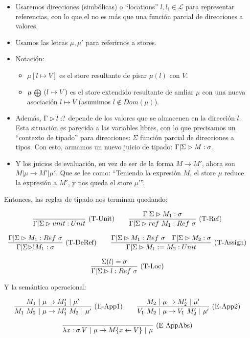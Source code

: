 \begin{itemize}
  \item Usaremos direcciones (simbólicas) o ``locations'' $l, l_i \in \mathcal{L}$ para representar referencias, con lo que el  no es más que una función parcial de direcciones a valores.
  \item Usamos las letras $\mu, \mu'$ para referirnos a stores.
  \item Notación:
    \begin{itemize}
      \item $\mu[l \mapsto V]$ es el store resultante de pisar $\mu(l)$ con $V$.
      \item $\mu\ {\scriptstyle \medoplus}\ (l \mapsto V)$ es el store extendido resultante de amliar $\mu$ con una nueva asociación $l \mapsto V$ (asumimos $l \notin Dom(\mu)$).
    \end{itemize}
  \item Además, $\Gamma \rhd l : ?$ depende de los valores que se almacenen en la dirección $l$. Esta situación es parecida a las variables libres, con lo que precisamos un ``contexto de tipado'' para direcciones: $\Sigma$ función parcial de direcciones a tipos. Con esto, armamos un nuevo juicio de tipado: $\Gamma|\Sigma \rhd M : \sigma$.
  \item Y los juicios de evaluación, en vez de ser de la forma $M \to M'$, ahora son  $M \vert \mu \to M' \vert \mu'$. Que se lee como: ``Teniendo la expresión $M$, el store $\mu$ reduce la expresión a $M'$, y nos queda el store $\mu'$''.
\end{itemize}

Entonces, las reglas de tipado nos terminan quedando:

\[\deriv{}{\GStipa{unit}{Unit}}{T-Unit}\quad\quad \deriv{\GStipa{M_1}{\sigma}}{\GStipa{ref\ M_1}{Ref\ \sigma}}{T-Ref}\]

\[\deriv{\GStipa{M_1}{Ref\ \sigma}}{\GStipa{!M_1}{\sigma}}{T-DeRef}\quad\quad \deriv{\GStipa{M_1}{Ref\ \sigma}\quad \GStipa{M_2}{\sigma}}{\GStipa{M_1 := M_2}{Unit}}{T-Assign}\]

\[\frac{\Sigma(l) = \sigma}{\Gamma|\Sigma \rhd l : Ref\ \sigma}\ \text{(T-Loc)}\]

Y la semántica operacional:

\[\frac{M_1 \ |\  \mu \to M_1' \ |\  \mu'}{M_1\ M_2 \ |\  \mu \to M_1'\ M_2 \ |\  \mu'}\ \text{(E-App1)}\quad\quad \frac{M_2 \ |\  \mu \to M_2' \ |\  \mu'}{V_1\ M_2 \ |\  \mu \to V_1\ M_2' \ |\  \mu'}\ \text{(E-App2)}\]

\[\frac{}{\lambda x:\sigma.V \ |\  \mu \to M\{x \leftarrow V\} \ |\  \mu}\ \text{(E-AppAbs)}\]

